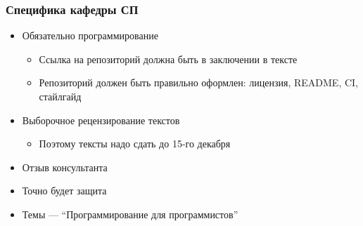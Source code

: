 \documentclass{../../slides-style}
\begin{document}
    \begin{frame}
        \frametitle{Специфика кафедры СП}
        \begin{itemize}
            \item Обязательно программирование
            \begin{itemize}
                \item Ссылка на репозиторий должна быть в заключении в тексте
                \item Репозиторий должен быть правильно оформлен: лицензия, README, CI, стайлгайд
            \end{itemize}
            \item Выборочное рецензирование текстов
            \begin{itemize}
                \item Поэтому тексты надо сдать до 15-го декабря
            \end{itemize}
            \item Отзыв консультанта
            \item Точно будет защита
            \item Темы --- ``Программирование для программистов''
        \end{itemize}
    \end{frame}
\end{document}
